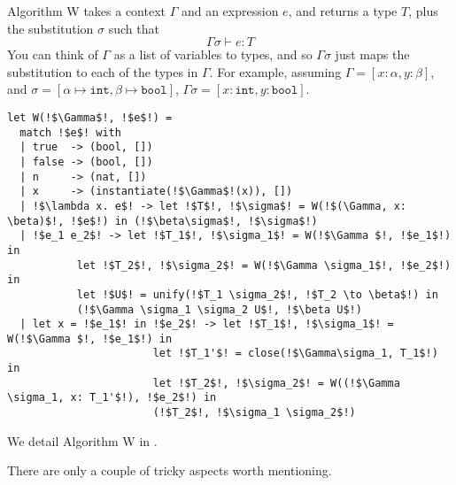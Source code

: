 {Algorithm W takes a context $\Gamma$ and an expression $e$, and returns a type $T$, plus the substitution $\sigma$ such that 
\[\Gamma \sigma \vdash e : T\]
You can think of $\Gamma$ as a list of variables to types, and so $\Gamma \sigma$ just maps the substitution to each of the types in $\Gamma$. For example, assuming $\Gamma = [x: \alpha, y: \beta]$, and $\sigma = [\alpha \mapsto \texttt{int}, \beta \mapsto \texttt{bool}]$, $\Gamma \sigma = [x: \texttt{int}, y: \texttt{bool}]$.

\begin{code}[Algorithm W]
\label{code:algorithm-w}
\begin{lstlisting}[style=pseudocode]
let W(!$\Gamma$!, !$e$!) = 
  match !$e$! with
  | true  -> (bool, [])
  | false -> (bool, [])
  | n     -> (nat, [])
  | x     -> (instantiate(!$\Gamma$!(x)), [])
  | !$\lambda x. e$! -> let !$T$!, !$\sigma$! = W(!$(\Gamma, x: \beta)$!, !$e$!) in (!$\beta\sigma$!, !$\sigma$!)
  | !$e_1 e_2$! -> let !$T_1$!, !$\sigma_1$! = W(!$\Gamma $!, !$e_1$!) in 
           let !$T_2$!, !$\sigma_2$! = W(!$\Gamma \sigma_1$!, !$e_2$!) in 
           let !$U$! = unify(!$T_1 \sigma_2$!, !$T_2 \to \beta$!) in
           (!$\Gamma \sigma_1 \sigma_2 U$!, !$\beta U$!)
  | let x = !$e_1$! in !$e_2$! -> let !$T_1$!, !$\sigma_1$! = W(!$\Gamma $!, !$e_1$!) in
                       let !$T_1'$! = close(!$\Gamma\sigma_1, T_1$!) in
                       let !$T_2$!, !$\sigma_2$! = W((!$\Gamma \sigma_1, x: T_1'$!), !$e_2$!) in
                       (!$T_2$!, !$\sigma_1 \sigma_2$!)
\end{lstlisting}
\vspace{1mm}
\end{code}

We detail Algorithm W in . 

There are only a couple of tricky aspects worth mentioning. 

}
